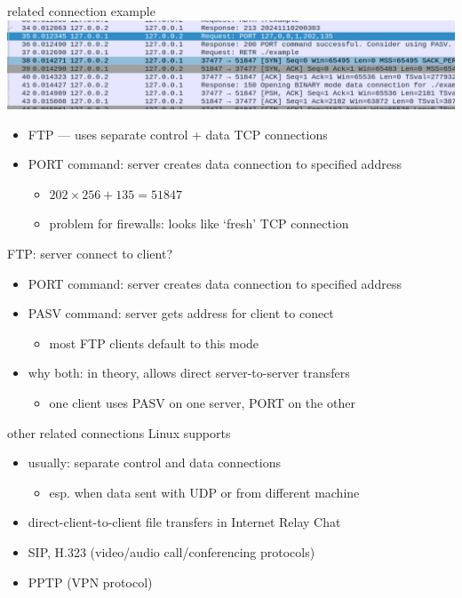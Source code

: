 

\begin{frame}{related connection example}
\includegraphics[width=\textwidth]{../fire/ftp-port-ex.png}
\begin{itemize}
\item FTP --- uses separate control + data TCP connections
\vspace{.5cm}
\item PORT command: server creates data connection to specified address
    \begin{itemize}
    \item $202 \times 256 + 135 = 51847$
    \item problem for firewalls: looks like `fresh' TCP connection
    \end{itemize}
\end{itemize}
\end{frame}

\begin{frame}{FTP: server connect to client?}
\begin{itemize}
\item PORT command: server creates data connection to specified address
\item PASV command: server gets address for client to conect
    \begin{itemize}
    \item most FTP clients default to this mode
    \end{itemize}
\item why both: in theory, allows direct server-to-server transfers
    \begin{itemize}
    \item one client uses PASV on one server, PORT on the other
    \end{itemize}
\end{itemize}
\end{frame}

\begin{frame}{other related connections Linux supports}
    \begin{itemize}
    \item usually: separate control and data connections
        \begin{itemize}
        \item esp. when data sent with UDP or from different machine
        \end{itemize}
    \vspace{.5cm}
    \item direct-client-to-client file transfers in Internet Relay Chat
    \item SIP, H.323 (video/audio call/conferencing protocols)
    \item PPTP (VPN protocol)
    \end{itemize}
\end{frame}

